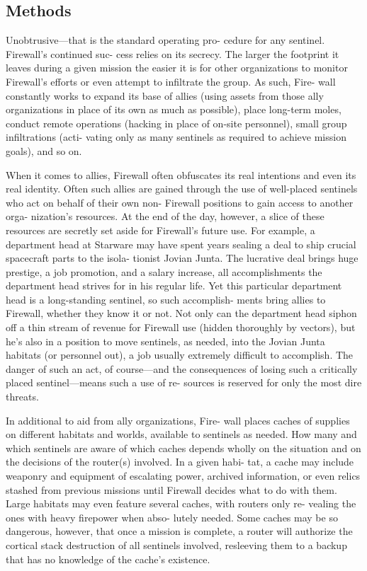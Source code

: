 \subsection{Methods }

Unobtrusive—that is the standard operating pro-
cedure for any sentinel. Firewall's continued suc-
cess relies on its secrecy. The larger the footprint 
it leaves during a given mission the easier it is for 
other organizations to monitor Firewall's efforts or 
even attempt to infiltrate the group. As such, Fire-
wall constantly works to expand its base of allies 
(using assets from those ally organizations in place 
of its own as much as possible), place long-term 
moles, conduct remote operations (hacking in place 
of on-site personnel), small group infiltrations (acti-
vating only as many sentinels as required to achieve 
mission goals), and so on. 

When it comes to allies, Firewall often obfuscates 
its real intentions and even its real identity. Often 
such allies are gained through the use of well-placed 
sentinels who act on behalf of their own non-
Firewall positions to gain access to another orga-
nization's resources. At the end of the day, however, 
a slice of these resources are secretly set aside for 
Firewall's future use. For example, a department 
head at Starware may have spent years sealing a 
deal to ship crucial spacecraft parts to the isola-
tionist Jovian Junta. The lucrative deal brings huge 
prestige, a job promotion, and a salary increase, all 
accomplishments the department head strives for in 
his regular life. Yet this particular department head 
is a long-standing sentinel, so such accomplish-
ments bring allies to Firewall, whether they know 
it or not. Not only can the department head siphon 
off a thin stream of revenue for Firewall use (hidden 
thoroughly by vectors), but he's also in a position 
to move sentinels, as needed, into the Jovian Junta 
habitats (or personnel out), a job usually extremely 
difficult to accomplish. The danger of such an act, 
of course—and the consequences of losing such a 
critically placed sentinel—means such a use of re-
sources is reserved for only the most dire threats. 

In additional to aid from ally organizations, Fire-
wall places caches of supplies on different habitats 
and worlds, available to sentinels as needed. How 
many and which sentinels are aware of which 
caches depends wholly on the situation and on the 
decisions of the router(s) involved. In a given habi-
tat, a cache may include weaponry and equipment 
of escalating power, archived information, or even 
relics stashed from previous missions until Firewall 
decides what to do with them. Large habitats may 
even feature several caches, with routers only re-
vealing the ones with heavy firepower when abso-
lutely needed. Some caches may be so dangerous, 
however, that once a mission is complete, a router 
will authorize the cortical stack destruction of all 
sentinels involved, resleeving them to a backup that 
has no knowledge of the cache's existence.

